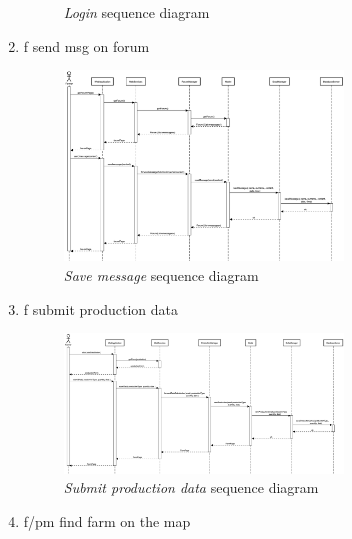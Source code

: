 \begin{enumerate}
\begin{figure}[H]
\begin{center}
        \caption{\emph{Login} sequence diagram}
        \label{fig:sequence2}
        \end{center}
    \end{figure}
    \item f send msg on forum
    \begin{figure}[H]
        \begin{center}
        \includegraphics[width=0.7\textwidth]{sequance/forum.png}
        \caption{\emph{Save message} sequence diagram}
        \label{fig:sequence3}
        \end{center}
    \end{figure}
    \item f submit production data
    \begin{figure}[H]
        \begin{center}
        \includegraphics[width=0.7\textwidth]{sequance/addData-2.png}
        \caption{\emph{Submit production data} sequence diagram}
        \label{fig:sequence4}
        \end{center}
    \end{figure}
    \item f/pm find farm on the map
    \begin{figure}[H]
        \begin{center}

\end{center}
\end{figure}
\end{enumerate}
